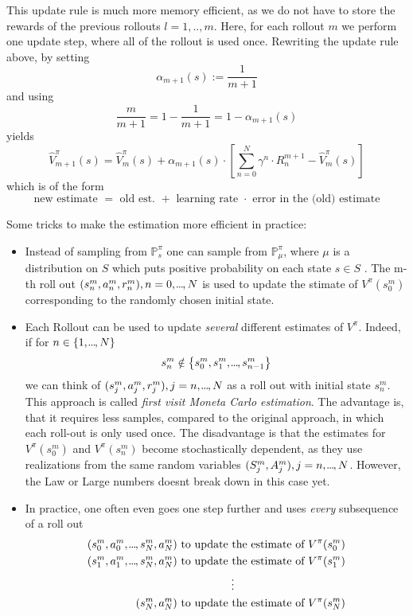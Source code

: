 This update rule is much more memory efficient, as we do not have to store the rewards of the previous rollouts \( l = 1,..,m \). Here, for each rollout \( m \) we perform one update step, where all of the rollout is used once.
Rewriting the update rule above, by setting
\[
    \alpha_{m+1}(s) := \frac{1}{m+1}
\]
and using 
\[
    \frac{m}{m+1} = 1 - \frac{1}{m+1} = 1 - \alpha_{m+1}(s)
\] 
yields 
\[
    \hat{V}_{m+1}^\pi(s) = \hat{V}_m^\pi(s) + \alpha_{m+1}(s) \cdot \left[ \sum_{n=0}^N \gamma^n \cdot R_n^{m+1} - \hat{V}_m^\pi(s) \right]
\]
which is of the form
\[
    \text{ new estimate } = \text{ old est. } + \text{ learning rate } \cdot \text{ error in the (old) estimate }
\] 
 
Some tricks to make the estimation more efficient in practice:
\begin{itemize}
    \item Instead of sampling from \( \mathbb{P}_s^\pi \) one can sample from \( \mathbb{P}_\mu^\pi \), where \( \mu \) is a distribution on \( S \) which puts positive probability on each state \( s \in S \) . The m-th roll out \( (s_n^m, a_n^m, r_n^m), n=0,\kern-0.10em.\kern-0.06em.\kern-0.06em.\kern-0.1em,N \) is used to update the stimate of \( V^\pi(s_{0}^m) \) corresponding to the randomly chosen initial state.
    
    \item Each Rollout can be used to update \emph{several} different estimates of \( V^\pi \). Indeed, if for \( n \in \left\{ 1,\kern-0.10em.\kern-0.06em.\kern-0.06em.\kern-0.1em,N \right\} \)
    \[
        s_n^m \notin \left\{ s_{0}^m, s_{1}^m, \kern-0.10em.\kern-0.06em.\kern-0.06em.\kern-0.1em, s_{n-1}^m \right\}
    \]
    we can think of \( (s_j^m, a_j^m, r_j^m), j=n,\kern-0.10em.\kern-0.06em.\kern-0.06em.\kern-0.1em,N \) as a roll out with initial state \( s_n^m  \). This approach is called \emph{first visit Moneta Carlo estimation}.
    The advantage is, that it requires less samples, compared to the original approach, in which each roll-out is only used once.
    The disadvantage is that the estimates for \( V^\pi(s_{0}^m) \) and \( V^\pi(s_n^m) \) become stochastically dependent, as they use realizations from the same random variables \( (S_j^m, A_j^m), j = n,\kern-0.10em.\kern-0.06em.\kern-0.06em.\kern-0.1em,N \). However, the Law or Large numbers doesnt break down in this case yet.
    
    \item In practice, one often even goes one step further and uses \emph{every} subsequence of a roll out 
    \begin{align*}
        (s_{0}^m, a_{0}^m, \kern-0.10em.\kern-0.06em.\kern-0.06em.\kern-0.1em, s_N^m, a_N^m) \text{ to update the estimate of } V^\pi(s_{0}^m) \\
        (s_{1}^m, a_{1}^m, \kern-0.10em.\kern-0.06em.\kern-0.06em.\kern-0.1em, s_N^m, a_N^m) \text{ to update the estimate of } V^\pi(s_{1}^m) \\
        \vdots\qquad \qquad \qquad \qquad \qquad  \\
        (s_{N}^m, a_{N}^m) \text{ to update the estimate of } V^\pi(s_{N}^m) \\
    \end{align*}
\end{itemize}
 
